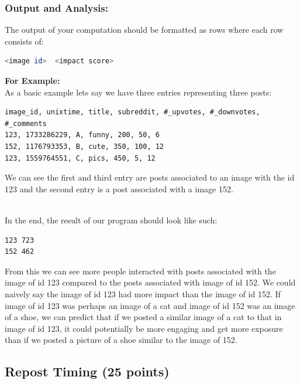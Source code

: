 \documentclass{article}
\begin{document}
\subsubsection*{Output and Analysis:}
The output of your computation should be formatted as rows where each row consists of:
\begin{lstlisting}[language=bash]
                        <image id>  <impact score>
\end{lstlisting}

\noindent \textbf{For Example:}\\
As a basic example lets say we have three entries representing three posts: 

\begin{Verbatim}[frame=single]
image_id, unixtime, title, subreddit, #_upvotes, #_downvotes, #_comments
123, 1733286229, A, funny, 200, 50, 6
152, 1176793353, B, cute, 350, 100, 12
123, 1559764551, C, pics, 450, 5, 12
\end{Verbatim}
We can see the first and third entry are posts associated to an image with the id 123 and the second entry is a post associated with a image 152.


\-\ \\In the end, the result of our program should look like such:
\begin{Verbatim}[frame=single]
123 723
152 462
\end{Verbatim}
From this we can see more people interacted with posts associated with the  image of id 123 compared to the posts associated with image of id 152. We could naively say the image of id 123 had more impact than the image of id 152. If image of id 123 was perhaps an image of a cat and image of id 152 was an image of a shoe, we can predict that if we posted a similar image of a cat to that in image of id 123, it could potentially be more engaging and get more exposure than if we posted a picture of a shoe similar to the image of 152.


\subsection{Repost Timing (25 points)}
\end{document}
